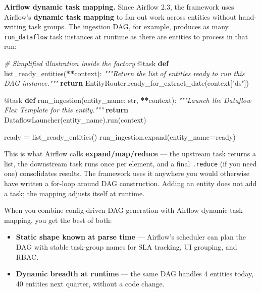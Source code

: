 \documentclass[
  11pt,
  british,
  oneside]{book}
\newenvironment{Shaded}{\begin{snugshade}}{\end{snugshade}}
\newcommand{\AttributeTok}[1]{\textcolor[rgb]{0.77,0.63,0.00}{#1}}
\newcommand{\BuiltInTok}[1]{#1}
\newcommand{\CommentTok}[1]{\textcolor[rgb]{0.56,0.35,0.01}{\textit{#1}}}
\newcommand{\ControlFlowTok}[1]{\textcolor[rgb]{0.13,0.29,0.53}{\textbf{#1}}}
\newcommand{\KeywordTok}[1]{\textcolor[rgb]{0.13,0.29,0.53}{\textbf{#1}}}
\newcommand{\NormalTok}[1]{#1}
\newcommand{\OperatorTok}[1]{\textcolor[rgb]{0.81,0.36,0.00}{\textbf{#1}}}
\newcommand{\StringTok}[1]{\textcolor[rgb]{0.31,0.60,0.02}{#1}}
\providecommand{\tightlist}{%
  \setlength{\itemsep}{0pt}\setlength{\parskip}{0pt}}
\begin{document}
\textbf{Airflow dynamic task mapping.} Since Airflow 2.3, the framework
uses Airflow's \textbf{dynamic task mapping} to fan out work across
entities without hand-writing task groups. The ingestion DAG, for
example, produces as many \texttt{run\_dataflow} task instances at
runtime as there are entities to process in that run:

\begin{Shaded}
\begin{Highlighting}[]
\CommentTok{\# Simplified illustration inside the factory}
\AttributeTok{@task}
\KeywordTok{def}\NormalTok{ list\_ready\_entities(}\OperatorTok{**}\NormalTok{context):}
    \CommentTok{"""Return the list of entities ready to run this DAG instance."""}
    \ControlFlowTok{return}\NormalTok{ EntityRouter.ready\_for\_extract\_date(context[}\StringTok{"ds"}\NormalTok{])}

\AttributeTok{@task}
\KeywordTok{def}\NormalTok{ run\_ingestion(entity\_name: }\BuiltInTok{str}\NormalTok{, }\OperatorTok{**}\NormalTok{context):}
    \CommentTok{"""Launch the Dataflow Flex Template for this entity."""}
    \ControlFlowTok{return}\NormalTok{ DataflowLauncher(entity\_name).run(context)}

\NormalTok{ready }\OperatorTok{=}\NormalTok{ list\_ready\_entities()}
\NormalTok{run\_ingestion.expand(entity\_name}\OperatorTok{=}\NormalTok{ready)}
\end{Highlighting}
\end{Shaded}

This is what Airflow calls \textbf{expand/map/reduce} --- the upstream
task returns a list, the downstream task runs once per element, and a
final \texttt{.reduce} (if you need one) consolidates results. The
framework uses it anywhere you would otherwise have written a for-loop
around DAG construction. Adding an entity does not add a task; the
mapping adjusts itself at runtime.

When you combine config-driven DAG generation with Airflow dynamic task
mapping, you get the best of both:

\begin{itemize}
\tightlist
\item
  \textbf{Static shape known at parse time} --- Airflow's scheduler can
  plan the DAG with stable task-group names for SLA tracking, UI
  grouping, and RBAC.
\item
  \textbf{Dynamic breadth at runtime} --- the same DAG handles 4
  entities today, 40 entities next quarter, without a code change.
\end{itemize}
\end{document}
